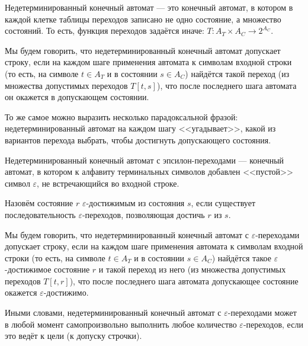 \documentclass[12pt,a4paper,oneside]{article}
\begin{document}
\begin{definition}
Недетерминированный конечный автомат --- это конечный автомат, в котором в каждой клетке
таблицы переходов записано не одно состояние, а множество состояний. То есть, функция 
переходов задаётся иначе: $T: A_T\times A_C \rightarrow 2^{A_C}$.
\end{definition}

\begin{definition}
Мы будем говорить, что недетерминированный конечный автомат допускает строку, если
на каждом шаге применения автомата к символам входной строки (то есть, на символе
$t \in A_T$ и в состоянии $s \in A_C$) найдётся такой переход (из множества допустимых 
переходов $T[t,s]$), что после последнего шага автомата он окажется в допускающем
состоянии.
\end{definition}

То же самое можно выразить несколько парадоксальной фразой: недетерминированный автомат 
на каждом шагу <<угадывает>>, какой из вариантов перехода выбрать, чтобы достигнуть 
допускающего состояния. 

\begin{definition}
Недетерминированный конечный автомат с эпсилон-переходами --- 
конечный автомат, в котором к алфавиту терминальных символов добавлен <<пустой>> символ
$\varepsilon$, не встречающийся во входной строке.
\end{definition}

\begin{definition}
Назовём состояние $r$ $\varepsilon$-достижимым из состояния $s$, если существует последовательность
$\varepsilon$-переходов, позволяющая достичь $r$ из $s$.
\end{definition}

\begin{definition}
Мы будем говорить, что недетерминированный конечный автомат с $\varepsilon$-переходами 
допускает строку, если на каждом шаге применения автомата к символам входной строки 
(то есть, на символе $t \in A_T$ и в состоянии $s \in A_C$) найдётся такое 
$\varepsilon$-достижимое состояние $r$ и такой переход из него (из множества допустимых 
переходов $T[t,r]$), что после последнего шага автомата допускающее состояние окажется
$\varepsilon$-достижимо.
\end{definition}

Иными словами, недетерминированный конечный автомат с $\varepsilon$-переходами может в
любой момент самопроизвольно выполнить любое количество $\varepsilon$-переходов,
если это ведёт к цели (к допуску строчки).
\end{document}
